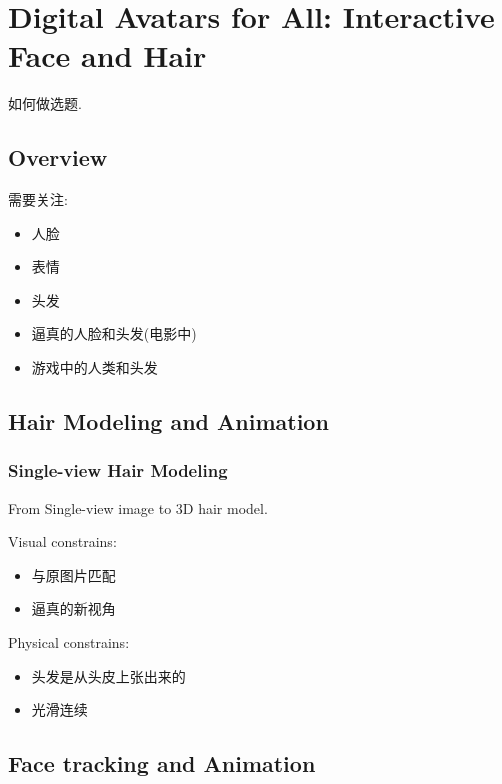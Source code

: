 \newpage
\section{Digital Avatars for All: Interactive Face and Hair}
如何做选题.

\subsection{Overview}
需要关注:
\begin{itemize}
    \item 人脸
    \item 表情
    \item 头发
    \item 逼真的人脸和头发(电影中)
    \item 游戏中的人类和头发
\end{itemize}

\subsection{Hair Modeling and Animation}
\subsubsection{Single-view Hair Modeling}
From Single-view image to 3D hair model.

Visual constrains:
\begin{itemize}
    \item 与原图片匹配
    \item 逼真的新视角
\end{itemize}

Physical constrains:
\begin{itemize}
    \item 头发是从头皮上张出来的
    \item 光滑连续
\end{itemize}



\subsection{Face tracking and Animation}